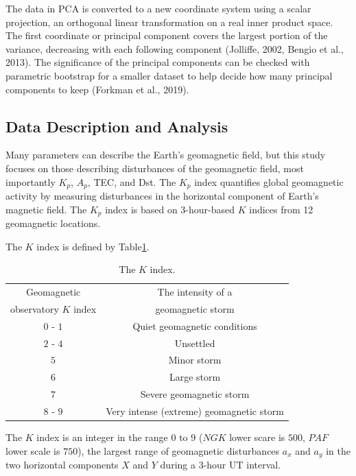 \documentclass[sn-mathphys-num]{sn-jnl}%
\begin{document}
The data in PCA is converted to a new coordinate system using a scalar projection, an orthogonal linear transformation on a real inner product space. The first coordinate or principal component covers the largest portion of the variance, decreasing with each following component (Jolliffe, 2002, Bengio et al., 2013). The significance of the principal components can be checked with parametric bootstrap for a smaller dataset to help decide how many principal components to keep (Forkman et al., 2019).

\subsection{Data Description and Analysis}

Many parameters can describe the Earth's geomagnetic field, but this study focuses on those describing disturbances of the geomagnetic field, most importantly $K_p$, $A_p$, TEC, and Dst. The $K_p$ index quantifies global geomagnetic activity by measuring disturbances in the horizontal component of Earth's magnetic field. The $K_p$ index is based on 3-hour-based $K$ indices from 12 geomagnetic locations.

The $K$ index is defined by Table\ref{tab:K}.

\begin{table}[!ht]
    \centering
    \caption{The $K$ index.}
    \label{tab:K}
    \begin{tabular}{|c|c|}
        \hline
        Geomagnetic & The intensity of a \\ 
        observatory $K$ index & geomagnetic storm \\ \hline
        $0$ - $1$ & Quiet geomagnetic conditions \\ \hline
        $2$ - $4$ & Unsettled \\ \hline
        $5$ & Minor storm \\ \hline
        $6$ & Large storm \\ \hline
        $7$ & Severe geomagnetic storm \\ \hline
        $8$ - $9$ & Very intense (extreme) geomagnetic storm \\ \hline
    \end{tabular}
\end{table}

The $K$ index is an integer in the range $0$ to $9$ ($NGK$ lower scare is $500$, $PAF$ lower scale is $750$), the largest range of geomagnetic disturbances $a_x$ and $a_y$ in the two horizontal components $X$ and $Y$ during a $3$-hour UT interval.
\end{document}
